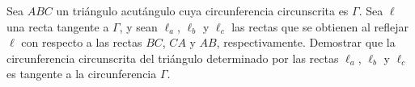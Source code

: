 Sea $ABC$ un triángulo acutángulo cuya circunferencia circunscrita es $\Gamma$. Sea $\ell$ una recta tangente a $\Gamma$, y sean $\ell_a$, $\ell_b$ y $\ell_c$ las rectas que se obtienen al reflejar $\ell$ con respecto a las rectas $BC$, $CA$ y $AB$, respectivamente. Demostrar que la circunferencia circunscrita del triángulo determinado por las rectas $\ell_a$, $\ell_b$ y $\ell_c$ es tangente a la circunferencia $\Gamma$.